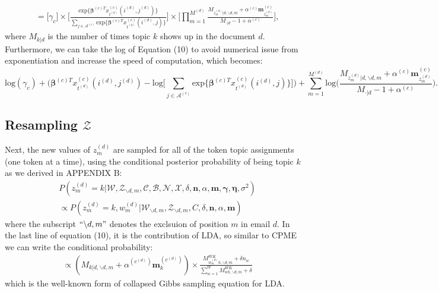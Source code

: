 \documentclass[a4paper]{article}
\begin{document}
   \begin{equation}
   \begin{aligned} &=\Big[ \gamma_{c}\Big]\times\Big[ \frac{\mbox{exp}\{\boldsymbol{\beta}^{(c)T}x^{(c)}_{t^{(d)}}(i^{(d)}, j^{(d)})\}}{\sum_{j\in \mathcal{A}^{(c)}} \mbox{exp}\{\boldsymbol{\beta}^{(c)T}x^{(c)}_{t^{(d)}}(i^{(d)}, j)\}}\Big]\times\Big[\prod_{m=1}^{M^{(d)}}
    \frac{M_{z_m^{(d)}|d, \backslash d, m}+\alpha^{(c)} \boldsymbol{m}^{(c)}_{z_m^{(d)}}}{M_{\cdot|d}-1+\alpha^{(c)}}\Big],
   \end{aligned}
   \end{equation}
where $M_{k|d}$ is the number of times topic $k$ shows up in the document $d$. Furthermore, we can take the log of Equation (10) to avoid numerical issue from exponentiation and increase the speed of computation, which becomes:
  	 \begin{equation}
\mbox{log}(\gamma_{c})+\Big(\boldsymbol{\beta}^{(c)T}x^{(c)}_{t^{(d)}}(i^{(d)}, j^{(d)})-\mbox{log}\big[\sum_{j\in \mathcal{A}^{(c)}}\mbox{exp}\{\boldsymbol{\beta}^{(c)T}x^{(c)}_{t^{(d)}}(i^{(d)}, j)\}\big]\Big)+\sum_{m=1}^{M^{(d)}}\mbox{log}\Big(\frac{M_{z_m^{(d)}|d, \backslash d, m}+\alpha^{(c)} \boldsymbol{m}^{(c)}_{z_m^{(d)}}}{M_{\cdot|d}-1+\alpha^{(c)}}\Big).
  	 \end{equation}
  \subsection{Resampling $\mathcal{Z}$}
Next, the new values of $z^{(d)}_m$ are sampled for all of the token topic assignments (one token at a time), using the conditional posterior probability of being topic $k$ as we derived in APPENDIX B:
\begin{equation}
\begin{aligned} & 
 P(z^{(d)}_m=k|\mathcal{W}, \mathcal{Z}_{\backslash d, m},  \mathcal{C}, \mathcal{B}, \mathcal{N}, \mathcal{X}, \delta, \boldsymbol{n}, \alpha, \boldsymbol{m}, \boldsymbol{\gamma}, \boldsymbol{\eta}, \sigma^2)\\
& \propto P(z^{(d)}_m=k, w^{(d)}_m|\mathcal{W}_{\backslash d, m}, \mathcal{Z}_{\backslash d,m}, C, \delta, \boldsymbol{n}, \alpha, \boldsymbol{m})
\end{aligned}
\end{equation}
where the subscript $``{\backslash d, m}"$ denotes the exclsuion of position $m$ in email $d$. In the last line of equation (10), it is the contribution of LDA, so similar to CPME we can write the conditional probability:
	\begin{equation}
	\begin{aligned} 
	& \propto(M_{k|d, \backslash d, m}+\alpha^{(c^{(d)})} \boldsymbol{m}^{(c^{(d)})}_k)\times\frac{M_{w_m^{(d)}k, \backslash d, m}^{WK}+\delta n_w}{\sum_{w=1}^WM_{wk,  \backslash d, m}^{WK}+\delta}
	\end{aligned}
	\end{equation}
	which is the well-known form of collapsed Gibbs sampling equation for LDA.
\end{document}
